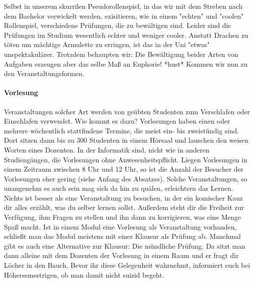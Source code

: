 Selbst in unserem skurrilen Pseudorollenspiel, in das wir mit dem Streben nach dem Bachelor verwickelt werden, exisitieren, wie in einem "echten" und "coolen" Rollenspiel, verschiedene Prüfungen, die zu bewältigen sind. Leider sind die Prüfungen im Studium wesentlich echter und weniger cooler. Anstatt Drachen zu töten um mächtige Armulette zu erringen, ist das in der Uni "etwas" unspektakulärer. Trotzdem behaupten wir: Die Bewältigung beider Arten von Aufgaben erzeugen aber das selbe Maß an Euphorie! *hust* 
Kommen wir nun zu den Veranstaltungsformen.

\paragraph{Vorlesung}
Veranstaltungen solcher Art werden von geübten Studenten zum Verschlafen oder Einschlafen verwendet. Wie kommt es dazu? Vorlesungen haben einen oder mehrere wöchentlich stattfindene Termine, die meist ein- bis zweistündig sind. Dort sitzen dann bis zu 300 Studenten in einem Hörsaal und lauschen den weisen Worten eines Dozenten. In der Informatik sind, nicht wie in anderen Studiengängen, die Vorlesungen ohne Anwesenheitspflicht. Liegen Vorlesungen in einem Zeitraum zwischen 8 Uhr und 12 Uhr, so ist die Anzahl der Besucher der Vorlesungen eher gering (siehe Anfang des Absatzes). Solche Veranstaltungen, so unangenehm es auch sein mag sich da hin zu quälen, erleichtern das Lernen. Nichts ist besser als eine Veranstaltung zu besuchen, in der ein komischer Kauz dir alles erzählt, was du selber lernen sollst. Außerdem steht dir die Freiheit zur Verfügung, ihm Fragen zu stellen und ihn dann zu korrigieren, was eine Menge Spaß macht. Ist in einem Modul eine Vorlesung als Veranstaltung vorhanden, schließt man das Modul meistens mit einer Klausur als Prüfung ab. Manchmal gibt es auch eine Alternative zur Klausur: Die mündliche Prüfung. Da sitzt man dann alleine mit dem Dozenten der Vorlesung in einem Raum und er fragt dir Löcher in den Bauch. Bevor ihr diese Gelegenheit wahrnehmt, informiert euch bei Höhersemestrigen, ob man damit nicht suizid begeht.

